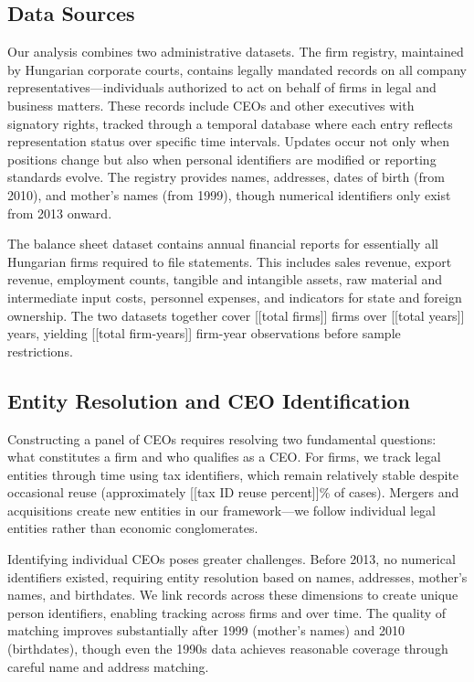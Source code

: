 \documentclass[11pt,a4paper]{article}
\begin{document}
\subsection{Data Sources}

Our analysis combines two administrative datasets. The firm registry, maintained by Hungarian corporate courts, contains legally mandated records on all company representatives—individuals authorized to act on behalf of firms in legal and business matters. These records include CEOs and other executives with signatory rights, tracked through a temporal database where each entry reflects representation status over specific time intervals. Updates occur not only when positions change but also when personal identifiers are modified or reporting standards evolve. The registry provides names, addresses, dates of birth (from 2010), and mother's names (from 1999), though numerical identifiers only exist from 2013 onward.

The balance sheet dataset contains annual financial reports for essentially all Hungarian firms required to file statements. This includes sales revenue, export revenue, employment counts, tangible and intangible assets, raw material and intermediate input costs, personnel expenses, and indicators for state and foreign ownership. The two datasets together cover [[total firms]] firms over [[total years]] years, yielding [[total firm-years]] firm-year observations before sample restrictions.

\subsection{Entity Resolution and CEO Identification}

Constructing a panel of CEOs requires resolving two fundamental questions: what constitutes a firm and who qualifies as a CEO. For firms, we track legal entities through time using tax identifiers, which remain relatively stable despite occasional reuse (approximately [[tax ID reuse percent]]\% of cases). Mergers and acquisitions create new entities in our framework—we follow individual legal entities rather than economic conglomerates.

Identifying individual CEOs poses greater challenges. Before 2013, no numerical identifiers existed, requiring entity resolution based on names, addresses, mother's names, and birthdates. We link records across these dimensions to create unique person identifiers, enabling tracking across firms and over time. The quality of matching improves substantially after 1999 (mother's names) and 2010 (birthdates), though even the 1990s data achieves reasonable coverage through careful name and address matching.
\end{document}
